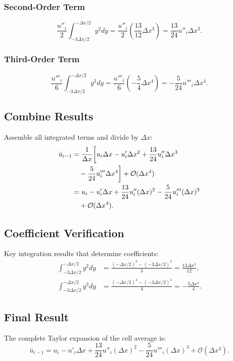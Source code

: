 \documentclass{article}
\begin{document}
\subsubsection{Second-Order Term}
\[
\frac{u''_i}{2} \int_{-3\Delta x/2}^{-\Delta x/2} y^2 dy = \frac{u''_i}{2} \left( \frac{13}{12}\Delta x^3 \right) = \frac{13}{24} u''_i \Delta x^3.
\]

\subsubsection{Third-Order Term}
\[
\frac{u'''_i}{6} \int_{-3\Delta x/2}^{-\Delta x/2} y^3 dy = \frac{u'''_i}{6} \left( -\frac{5}{4}\Delta x^4 \right) = -\frac{5}{24} u'''_i \Delta x^4.
\]

\subsection{Combine Results}
Assemble all integrated terms and divide by $\Delta x$:
\begin{align}
\bar{u}_{i-1} &= \frac{1}{\Delta x} \bigg[ u_i \Delta x - u'_i \Delta x^2 + \frac{13}{24} u''_i \Delta x^3 \notag \\
&\quad - \frac{5}{24} u'''_i \Delta x^4 \bigg] + \mathcal{O}(\Delta x^4) \\
&= u_i - u'_i \Delta x + \frac{13}{24} u''_i (\Delta x)^2 - \frac{5}{24} u'''_i (\Delta x)^3 \notag \\
&\quad + \mathcal{O}(\Delta x^4).
\end{align}

\subsection{Coefficient Verification}
Key integration results that determine coefficients:
\begin{align}
\int_{-3\Delta x/2}^{-\Delta x/2} y^2 dy &= \frac{( -\Delta x/2 )^3 - ( -3\Delta x/2 )^3}{3} = \frac{13\Delta x^3}{12}, \\
\int_{-3\Delta x/2}^{-\Delta x/2} y^3 dy &= \frac{( -\Delta x/2 )^4 - ( -3\Delta x/2 )^4}{4} = -\frac{5\Delta x^4}{4}.
\end{align}

\subsection{Final Result}
The complete Taylor expansion of the cell average is:
\[
\bar{u}_{i-1} = u_i - u'_i \Delta x + \frac{13}{24} u''_i (\Delta x)^2 - \frac{5}{24} u'''_i (\Delta x)^3 + \mathcal{O}(\Delta x^4).
\]
\end{document}
